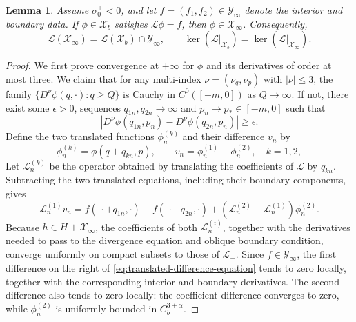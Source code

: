 \documentclass[12pt,letterpaper]{amsart}
\newtheorem{lemma}[theorem]{Lemma}
\numberwithin{equation}{section}
\begin{document}
	
	
	\begin{lemma}\label{lem:range-regularity}
	{Assume $\sigma_0^\pm<0$, and let $f=(f_1,f_2)\in\mathscr Y_\infty$ denote the interior and boundary data. If $\phi\in\mathscr X_b$ satisfies $\mathscr L\phi=f$, then $\phi\in\mathscr X_\infty$. Consequently,}
	\begin{equation}\label{eq:range-intersection}
		\mathscr L(\mathscr X_\infty)=\mathscr L(\mathscr X_b)\cap\mathscr Y_\infty,
		\qquad
		\ker(\mathscr L|_{\mathscr X_b})
		=\ker(\mathscr L|_{\mathscr X_\infty}).
		\end{equation}
	\end{lemma}
	\begin{proof}
		{We first prove convergence at $+\infty$ for $\phi$ and its derivatives of order at most three.} We claim that for any multi-index $\nu=(\nu_q,\nu_p)$ with $|\nu|\leq3$, the family $\{D^\nu \phi(q,\cdot):q\geq Q\}$ is Cauchy in $C^0([-m,0])$ as $Q\to\infty$. If not, there exist some $\epsilon>0$, sequences $q_{1n},q_{2n}\to\infty$ and $p_n\to p_*\in[-m,0]$ such that
		\begin{equation}\label{eq:endpoint-separation}
		|D^\nu\phi(q_{1n},p_n)-D^\nu\phi(q_{2n},p_n)|\geq\epsilon.
		\end{equation}
		{Define the two translated functions $\phi_n^{(k)}$ and their difference $v_n$ by}
		\begin{equation*}
			\phi_n^{(k)}=\phi(q+q_{kn},p),\qquad v_n=\phi_n^{(1)}-\phi_n^{(2)},\quad k=1,2,
		\end{equation*}
		{Let $\mathscr L_n^{(k)}$ be the operator obtained by translating the coefficients of $\mathscr L$ by $q_{kn}$. Subtracting the two translated equations, including their boundary components, gives}
		\begin{equation}\label{eq:translated-difference-equation}
			{\mathscr L_n^{(1)}}v_n
			=f(\,\cdot+q_{1n},\cdot)-f(\,\cdot+q_{2n},\cdot)
			+({\mathscr L_n^{(2)}}-{\mathscr L_n^{(1)}})\phi_n^{(2)}.
		\end{equation}
		Because \(h\in H+\mathscr X_\infty\), the coefficients of both
		\({\mathscr L_n^{(i)}}\), together with the derivatives needed to pass to the
		divergence equation and oblique boundary condition, converge uniformly on
		compact subsets to those of \(\mathscr L_+\).  Since \(f\in\mathscr Y_\infty\), the
		first difference on the right of
		\eqref{eq:translated-difference-equation} tends to zero locally, together
		with the corresponding interior and boundary derivatives.  The second
		difference also tends to zero locally: the coefficient difference converges
		to zero, while \(\phi_n^{(2)}\) is uniformly bounded in
		\(C_b^{3+\alpha}\).
		

\end{proof}
\end{document}
